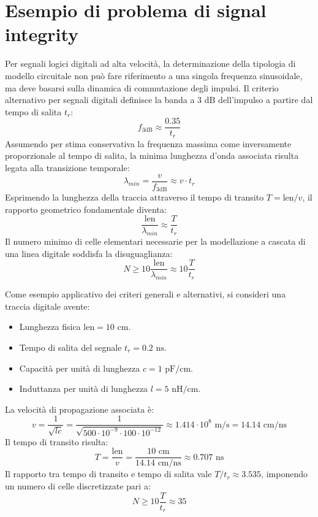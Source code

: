 \newpage
\section{Esempio di problema di signal integrity}
Per segnali logici digitali ad alta velocità, la determinazione della tipologia di modello circuitale non può fare riferimento a una singola frequenza sinusoidale, ma deve basarsi sulla dinamica di commutazione degli impulsi. Il criterio alternativo per segnali digitali definisce la banda a $3\text{ dB}$ dell'impulso a partire dal tempo di salita $t_r$:
\[
f_{3\text{dB}} \approx \frac{0.35}{t_r}
\]
Assumendo per stima conservativa la frequenza massima come inversamente proporzionale al tempo di salita, la minima lunghezza d'onda associata risulta legata alla transizione temporale:
\[
\lambda_{min} = \frac{v}{f_{3\text{dB}}} \approx v \cdot t_r
\]
Esprimendo la lunghezza della traccia attraverso il tempo di transito $T = \text{len}/v$, il rapporto geometrico fondamentale diventa:
\[
\frac{\text{len}}{\lambda_{min}} \approx \frac{T}{t_r}
\]
Il numero minimo di celle elementari necessarie per la modellazione a cascata di una linea digitale soddisfa la disuguaglianza:
\[
N \ge 10 \frac{\text{len}}{\lambda_{min}} \approx 10 \frac{T}{t_r}
\]

Come esempio applicativo dei criteri generali e alternativi, si consideri una traccia digitale avente:
\begin{itemize}
    \item Lunghezza fisica $\text{len} = 10\text{ cm}$.
    \item Tempo di salita del segnale $t_r = 0.2\text{ ns}$.
    \item Capacità per unità di lunghezza $c = 1\text{ pF/cm}$.
    \item Induttanza per unità di lunghezza $l = 5\text{ nH/cm}$.
\end{itemize}
La velocità di propagazione associata è:
\[
v = \frac{1}{\sqrt{l c}} = \frac{1}{\sqrt{500 \cdot 10^{-9} \cdot 100 \cdot 10^{-12}}} \approx 1.414 \cdot 10^8\text{ m/s} = 14.14\text{ cm/ns}
\]
Il tempo di transito risulta:
\[
T = \frac{\text{len}}{v} = \frac{10\text{ cm}}{14.14\text{ cm/ns}} \approx 0.707\text{ ns}
\]
Il rapporto tra tempo di transito e tempo di salita vale $T/t_r \approx 3.535$, imponendo un numero di celle discretizzate pari a:
\[
N \ge 10 \frac{T}{t_r} \approx 35
\]

